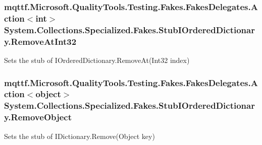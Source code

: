 \hypertarget{class_system_1_1_collections_1_1_specialized_1_1_fakes_1_1_stub_i_ordered_dictionary_a8c11325f71648d32b7371f8912354078}{
\subsubsection[{Remove\-At\-Int32}]{\setlength{\rightskip}{0pt plus 5cm}mqttf.\-Microsoft.\-Quality\-Tools.\-Testing.\-Fakes.\-Fakes\-Delegates.\-Action$<$int$>$ System.\-Collections.\-Specialized.\-Fakes.\-Stub\-I\-Ordered\-Dictionary.\-Remove\-At\-Int32}}\label{class_system_1_1_collections_1_1_specialized_1_1_fakes_1_1_stub_i_ordered_dictionary_a8c11325f71648d32b7371f8912354078}


Sets the stub of I\-Ordered\-Dictionary.\-Remove\-At(\-Int32 index)

\hypertarget{class_system_1_1_collections_1_1_specialized_1_1_fakes_1_1_stub_i_ordered_dictionary_aaf798cba0fb6c2b194f56e1f791c7b3a}{
\subsubsection[{Remove\-Object}]{\setlength{\rightskip}{0pt plus 5cm}mqttf.\-Microsoft.\-Quality\-Tools.\-Testing.\-Fakes.\-Fakes\-Delegates.\-Action$<$object$>$ System.\-Collections.\-Specialized.\-Fakes.\-Stub\-I\-Ordered\-Dictionary.\-Remove\-Object}}\label{class_system_1_1_collections_1_1_specialized_1_1_fakes_1_1_stub_i_ordered_dictionary_aaf798cba0fb6c2b194f56e1f791c7b3a}


Sets the stub of I\-Dictionary.\-Remove(\-Object key)

